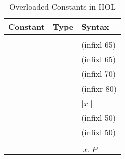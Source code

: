 \begin{isabellebody}
\begin{isamarkuptext}
\begin{table}[htbp]
\begin{center}
\begin{tabular}{lll}
Constant & Type & Syntax \\
\hline
\isa{{\isadigit{0}}} & \isa{{\isacharprime}a{\isacharcolon}{\isacharcolon}zero} \\
\isa{{\isacharplus}} & \isa{{\isacharparenleft}{\isacharprime}a{\isacharcolon}{\isacharcolon}plus{\isacharparenright}\ {\isasymRightarrow}\ {\isacharprime}a\ {\isasymRightarrow}\ {\isacharprime}a} & (infixl 65) \\
\isa{{\isacharminus}} & \isa{{\isacharparenleft}{\isacharprime}a{\isacharcolon}{\isacharcolon}minus{\isacharparenright}\ {\isasymRightarrow}\ {\isacharprime}a\ {\isasymRightarrow}\ {\isacharprime}a} &  (infixl 65) \\
\isa{{\isacharasterisk}} & \isa{{\isacharparenleft}{\isacharprime}a{\isacharcolon}{\isacharcolon}times{\isacharparenright}\ {\isasymRightarrow}\ {\isacharprime}a\ {\isasymRightarrow}\ {\isacharprime}a} & (infixl 70) \\
\isa{{\isacharcircum}} & \isa{{\isacharparenleft}{\isacharprime}a{\isacharcolon}{\isacharcolon}power{\isacharparenright}\ {\isasymRightarrow}\ nat\ {\isasymRightarrow}\ {\isacharprime}a} & (infixr 80) \\
\isa{{\isacharminus}} & \isa{{\isacharparenleft}{\isacharprime}a{\isacharcolon}{\isacharcolon}minus{\isacharparenright}\ {\isasymRightarrow}\ {\isacharprime}a} \\
\isa{abs} &  \isa{{\isacharparenleft}{\isacharprime}a{\isacharcolon}{\isacharcolon}minus{\isacharparenright}\ {\isasymRightarrow}\ {\isacharprime}a} & ${\mid} x {\mid}$\\
\isa{{\isasymle}} & \isa{{\isacharparenleft}{\isacharprime}a{\isacharcolon}{\isacharcolon}ord{\isacharparenright}\ {\isasymRightarrow}\ {\isacharprime}a\ {\isasymRightarrow}\ bool} & (infixl 50) \\
\isa{{\isacharless}} & \isa{{\isacharparenleft}{\isacharprime}a{\isacharcolon}{\isacharcolon}ord{\isacharparenright}\ {\isasymRightarrow}\ {\isacharprime}a\ {\isasymRightarrow}\ bool} & (infixl 50) \\
\isa{min} &  \isa{{\isacharparenleft}{\isacharprime}a{\isacharcolon}{\isacharcolon}ord{\isacharparenright}\ {\isasymRightarrow}\ {\isacharprime}a\ {\isasymRightarrow}\ {\isacharprime}a} \\
\isa{max} &  \isa{{\isacharparenleft}{\isacharprime}a{\isacharcolon}{\isacharcolon}ord{\isacharparenright}\ {\isasymRightarrow}\ {\isacharprime}a\ {\isasymRightarrow}\ {\isacharprime}a} \\
\isa{Least} & \isa{{\isacharparenleft}{\isacharprime}a{\isacharcolon}{\isacharcolon}ord\ {\isasymRightarrow}\ bool{\isacharparenright}\ {\isasymRightarrow}\ {\isacharprime}a} &
\isa{LEAST}$~x.~P$
\end{tabular}
\caption{Overloaded Constants in HOL}
\label{tab:overloading}
\end{center}
\end{table}


\end{isamarkuptext}
\end{isabellebody}
